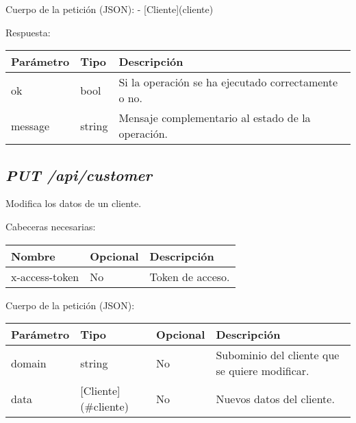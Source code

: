 Cuerpo de la petición (JSON):
- [Cliente](cliente)


Respuesta:
\begin{table}[!h]
	\centering
	\begin{adjustbox}{max width=\textwidth}
	\begin{tabular}{|l|l|l|}
		\hline
		Parámetro & Tipo & Descripción \\ \hline
		ok & bool & Si la operación se ha ejecutado correctamente o no. \\ \hline
		message & string & Mensaje complementario al estado de la operación. \\ \hline
	\end{tabular}
\end{adjustbox}
\end{table}



\subsection{\textit{PUT /api/customer}}
Modifica los datos de un cliente.

Cabeceras necesarias:
\begin{table}[h!]
	\centering
	\begin{adjustbox}{max width=\textwidth}
	\begin{tabular}{|l|l|l|}
		\hline
		Nombre & Opcional & Descripción \\ \hline
		x-access-token & No & Token de acceso. \\ \hline
	\end{tabular}
\end{adjustbox}
\end{table}

Cuerpo de la petición (JSON):
\begin{table}[!h]
	\centering
	\begin{adjustbox}{max width=\textwidth}
	\begin{tabular}{|l|l|l|l|}
		\hline
		Parámetro & Tipo & Opcional & Descripción \\ \hline
		domain & string & No & Subominio del cliente que se quiere modificar. \\ \hline
		data & [Cliente](\#cliente) & No & Nuevos datos del cliente. \\ \hline
	\end{tabular}
\end{adjustbox}
\end{table}

